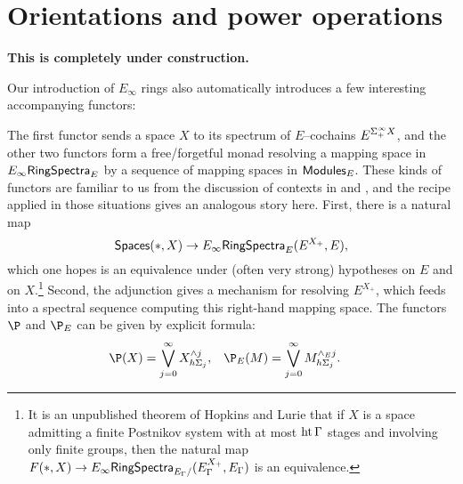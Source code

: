 \section{Orientations and power operations}\label{PowerOpnsChapter}

\begin{center}
\textbf{\Large This is completely under construction.}
\end{center}



Our introduction of $E_\infty$ rings also automatically introduces a few interesting accompanying functors:
\begin{center}
\end{center}
The first functor sends a space $X$ to its spectrum of $E$--cochains $E^{\Sigma^\infty_+ X}$, and the other two functors form a free/forgetful monad resolving a mapping space in $E_\infty\mathsf{RingSpectra}_E$ by a sequence of mapping spaces in $\mathsf{Modules}_E$.  These kinds of functors are familiar to us from the discussion of contexts in  and , and the recipe applied in those situations gives an analogous story here.  First, there is a natural map \[\mathsf{Spaces}(*, X) \to E_\infty\mathsf{RingSpectra}_E(E^{X_+}, E),\] which one hopes is an equivalence under (often very strong) hypotheses on $E$ and on $X$.\footnote{It is an unpublished theorem of Hopkins and Lurie that if $X$ is a space admitting a finite Postnikov system with at most $\operatorname{ht} \Gamma$ stages and involving only finite groups, then the natural map $F(*, X) \to E_\infty\mathsf{RingSpectra}_{E_\Gamma/}(E_\Gamma^{X_+}, E_\Gamma)$ is an equivalence.}  Second, the adjunction gives a mechanism for resolving $E^{X_+}$, which feeds into a spectral sequence computing this right-hand mapping space.  The functors $\P$ and $\P_E$ can be given by explicit formula:
\begin{align*}
\P(X) & = \bigvee_{j=0}^\infty X^{\sm j}_{h\Sigma_j}, &
\P_E(M) & = \bigvee_{j=0}^\infty M^{\sm_E j}_{h\Sigma_j}.
\end{align*}
